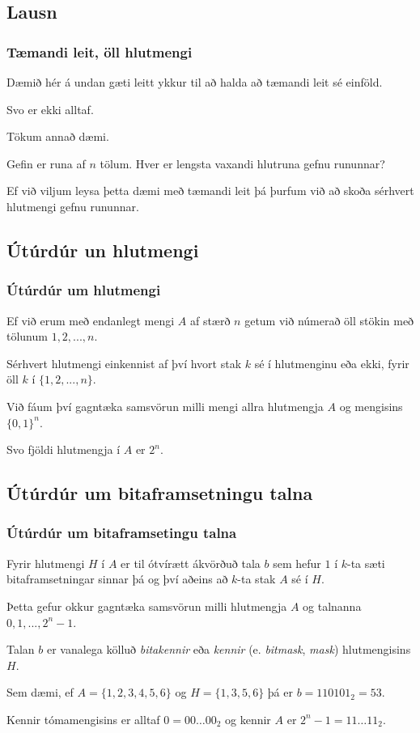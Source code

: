 \subsection{Lausn}
{
    \frametitle{Tæmandi leit, öll hlutmengi}
    {
        \item<1-> Dæmið hér á undan gæti leitt ykkur til að halda að tæmandi leit sé einföld.
        \item<2-> Svo er ekki alltaf.
        \item<3-> Tökum annað dæmi.
        \item<4-> Gefin er runa af $n$ tölum. Hver er lengsta vaxandi hlutruna gefnu rununnar?
        \item<5-> Ef við viljum leysa þetta dæmi með tæmandi leit þá þurfum við að skoða sérhvert hlutmengi gefnu rununnar.
    }
}

\subsection{Útúrdúr un hlutmengi}
{
    \frametitle{Útúrdúr um hlutmengi}
    {
        \item<1-> Ef við erum með endanlegt mengi $A$ af stærð $n$ getum við númerað öll stökin með tölunum $1, 2, ..., n$.
        \item<2-> Sérhvert hlutmengi einkennist af því hvort stak $k$ sé í hlutmenginu eða ekki, fyrir öll $k$ í $\{1, 2, ..., n\}$.
        \item<3-> Við fáum því gagntæka samsvörun milli mengi allra hlutmengja $A$ og mengisins $\{0, 1\}^n$.
        \item<4-> Svo fjöldi hlutmengja í $A$ er $2^n$.
    }
}

\subsection{Útúrdúr um bitaframsetningu talna}
{
    \frametitle{Útúrdúr um bitaframsetingu talna}
    {
        \item<1-> Fyrir hlutmengi $H$ í $A$ er til ótvírætt ákvörðuð tala $b$ sem hefur $1$ í
            $k$-ta sæti bitaframsetningar sinnar þá og því aðeins að $k$-ta stak $A$ sé í $H$.
        \item<2-> Þetta gefur okkur gagntæka samsvörun milli hlutmengja $A$ og talnanna $0, 1, ..., 2^n - 1$.
        \item<3-> Talan $b$ er vanalega kölluð \emph{bitakennir} eða \emph{kennir} (e. \emph{bitmask}, \emph{mask}) hlutmengisins $H$.
        \item<4-> Sem dæmi, ef $A = \{1, 2, 3, 4, 5, 6\}$ og $H = \{1, 3, 5, 6\}$ þá er $b = 110101_2 = 53$.
        \item<5-> Kennir tómamengisins er alltaf $0 = 00\! \dots\! 00_2$ og kennir $A$ er $2^n - 1 = 11\! \dots\! 11_2$.
    }
}

